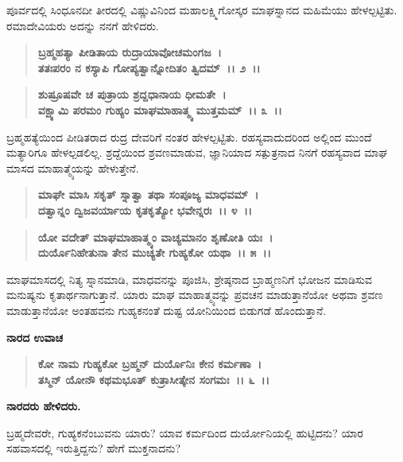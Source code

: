 ಪೂರ್ವದಲ್ಲಿ ಸಿಂಧೂನದೀ ತೀರದಲ್ಲಿ ವಿಷ್ಣುವಿನಿಂದ ಮಹಾಲಕ್ಷ್ಮಿಗೋಸ್ಕರ ಮಾಘಸ್ನಾನದ ಮಹಿಮೆಯು ಹೇಳಲ್ಪಟ್ಟಿತು. ರಮಾದೇವಿಯರು ಅದನ್ನು ನನಗೆ ಹೇಳಿದರು.

\begin{verse}
\textbf{ಬ್ರಹ್ಮಹತ್ಯಾ ಪೀಡಿತಾಯ ರುದ್ರಾಯಾವೋಚಮಂಗಜ~।}\\\textbf{ತತಃಪರಂ ನ ಕಸ್ಯಾಪಿ ಗೋಪ್ಯತ್ವಾನ್ನೋದಿತಂ ತ್ವಿದಮ್~।। ೨~।।} 
\end{verse}

\begin{verse}
\textbf{ಶುಷ್ರೂಷವೇ ಚ ಪುತ್ರಾಯ ಶ್ರದ್ದಧಾನಾಯ ಧೀಮತೇ~।}\\\textbf{ವಕ್ಷ್ಯಾಮಿ ಪರಮಂ ಗುಹ್ಯಂ ಮಾಘಮಾಹಾತ್ಮ್ಯ ಮುತ್ತಮಮ್~।। ೩~।।}
\end{verse}

ಬ್ರಹ್ಮಹತ್ಯೆಯಿಂದ ಪೀಡಿತರಾದ ರುದ್ರ ದೇವರಿಗೆ ನಂತರ ಹೇಳಲ್ಪಟ್ಟಿತು. ರಹಸ್ಯವಾದುದರಿಂದ ಅಲ್ಲಿಂದ ಮುಂದೆ ಮತ್ಯಾರಿಗೂ ಹೇಳಲ್ಪಡಲಿಲ್ಲ. ಶ್ರದ್ದೆಯಿಂದ ಶ್ರವಣಮಾಡುವ, ಜ್ಞಾನಿಯಾದ ಸತ್ಪುತ್ರನಾದ ನಿನಗೆ ರಹಸ್ಯವಾದ ಮಾಘ ಮಾಸದ ಮಾಹಾತ್ಮ್ಯೆಯನ್ನು ಹೇಳುತ್ತೇನೆ.

\begin{verse}
\textbf{ಮಾಘೇ ಮಾಸಿ ಸಕೃತ್ ಸ್ನಾತ್ವಾ ತಥಾ ಸಂಪೂಜ್ಯ ಮಾಧವಮ್~।}\\\textbf{ದತ್ವಾನ್ನಂ ದ್ವಿಜವರ್ಯಾಯ ಕೃತಕೃತ್ಯೋ ಭವೇನ್ನರಃ~।। ೪~।। }
\end{verse}

\begin{verse}
\textbf{ಯೋ ವದೇತ್ ಮಾಘಮಾಹಾತ್ಮ್ಯಂ ವಾಚ್ಯಮಾನಂ ಶೃಣೋತಿ ಯಃ~।}\\\textbf{ದುರ್ಯೊನಿಹೇತುನಾ ತೇನ ಮುಚ್ಯತೇ ಗುಹ್ಯಕೋ ಯಥಾ~।। ೫~।।}
\end{verse}

ಮಾಘಮಾಸದಲ್ಲಿ ನಿತ್ಯ ಸ್ನಾನಮಾಡಿ, ಮಾಧವನನ್ನು ಪೂಜಿಸಿ, ಶ್ರೇಷ್ಠನಾದ ಬ್ರಾಹ್ಮಣನಿಗೆ ಭೋಜನ ಮಾಡಿಸುವ ಮನುಷ್ಯನು ಕೃತಾರ್ಥನಾಗುತ್ತಾನೆ. ಯಾರು ಮಾಘ ಮಾಹಾತ್ಮ್ಯವನ್ನು ಪ್ರವಚನ ಮಾಡುತ್ತಾನೆಯೋ ಅಥವಾ ಶ್ರವಣ ಮಾಡುತ್ತಾನೆಯೋ ಅಂತಹವನು ಗುಹ್ಯಕನಂತೆ ದುಷ್ಟ ಯೋನಿಯಿಂದ ಬಿಡುಗಡೆ ಹೊಂದುತ್ತಾನೆ.

\begin{flushleft}
\textbf{ನಾರದ ಉವಾಚ\enginline{-}}
\end{flushleft}

\begin{verse}
\textbf{ಕೋ ನಾಮ ಗುಹ್ಯಕೋ ಬ್ರಹ್ಮನ್ ದುರ್ಯೊನಿಃ ಕೇನ ಕರ್ಮಣಾ~।}\\\textbf{ತಸ್ಮಿನ್ ಯೋನೌ ಕಥಮಭೂತ್ ಕುತ್ರಾಸೀತ್ಕೇನ ಸಂಗಮಃ~।। ೬~।।}
\end{verse}

\begin{flushleft}
\textbf{ನಾರದರು ಹೇಳಿದರು.}
\end{flushleft}

ಬ್ರಹ್ಮದೇವರೇ, ಗುಹ್ಯಕನೆಂಬುವನು ಯಾರು? ಯಾವ ಕರ್ಮದಿಂದ ದುರ್ಯೋನಿಯಲ್ಲಿ ಹುಟ್ಟಿದನು? ಯಾರ ಸಹವಾಸದಲ್ಲಿ ಇರುತ್ತಿದ್ದನು? ಹೇಗೆ ಮುಕ್ತನಾದನು?

